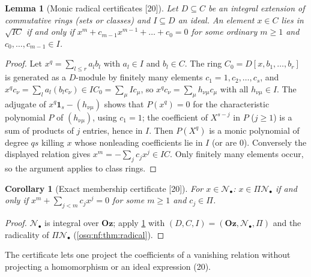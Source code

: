 \documentclass[11pt,letterpaper]{article}
\numberwithin{equation}{section}
\newtheorem{lemma}[lemma]{Lemma}
\newtheorem{corollary}[corollary]{Corollary}
\theoremstyle{definition}
\theoremstyle{remark}
\theoremstyle{plain}
\newcommand{\Oz}{\mathbf{Oz}}
\newcommand{\NN}{\mathcal N}         %
\newcommand{\src}[1]{\textup{\textsf{[#1]}}}
\begin{document}
\begin{lemma}[Monic radical certificates \src{20}]\label{osq:bb:lem:certificate}
Let $D\subseteq C$ be an integral extension of commutative rings (sets or classes) and $I\subseteq D$ an ideal. An element $x\in C$
lies in $\sqrt{IC}$ if and only if $x^m+c_{m-1}x^{m-1}+\dots+c_0=0$ for some ordinary $m\ge1$ and $c_0,\dots,c_{m-1}\in I$.
\end{lemma}
\begin{proof}
Let $x^q=\sum_{l\le r}a_lb_l$ with $a_l\in I$ and $b_l\in C$. The ring $C_0=D[x,b_1,\dots,b_r]$ is generated as a $D$-module by
finitely many elements $c_1=1,c_2,\dots,c_s$, and $x^qc_\nu=\sum_la_l(b_lc_\nu)\in IC_0=\sum_\mu Ic_\mu$, so
$x^qc_\nu=\sum_\mu h_{\nu\mu}c_\mu$ with all $h_{\nu\mu}\in I$. The adjugate of $x^q\mathbf 1_s-(h_{\nu\mu})$ shows that $P(x^q)=0$ for the
characteristic polynomial $P$ of $(h_{\nu\mu})$, using $c_1=1$; the coefficient of $X^{s-j}$ in $P$ ($j\ge1$) is a sum of products of
$j$ entries, hence in $I$. Then $P(X^q)$ is a
monic polynomial of degree $qs$ killing $x$ whose nonleading coefficients lie in $I$ (or are $0$). Conversely the displayed
relation gives $x^m=-\sum_jc_jx^j\in IC$. Only finitely many elements occur, so the argument applies to class rings.
\end{proof}

\begin{corollary}[Exact membership certificate \src{20}]\label{osq:bb:cor:certificate}
For $x\in\NN_\bullet$: $x\in\Pi\NN_\bullet$ if and only if $x^m+\sum_{j<m}c_jx^j=0$ for some $m\ge1$ and $c_j\in\Pi$.
\end{corollary}
\begin{proof}
$\NN_\bullet$ is integral over $\Oz$; apply \cref{osq:bb:lem:certificate} with $(D,C,I)=(\Oz,\NN_\bullet,\Pi)$ and the radicality
of $\Pi\NN_\bullet$ (\cref{osq:nf:thm:radical}).
\end{proof}

The certificate lets one project the coefficients of a vanishing relation without projecting a homomorphism or an ideal
expression (20).
\end{document}
